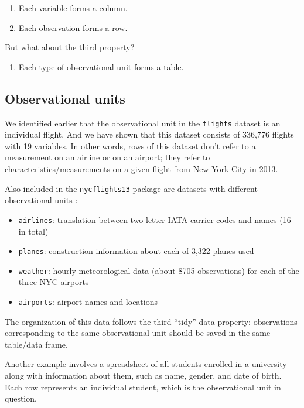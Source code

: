 \documentclass[12pt,]{krantz}
\providecommand{\tightlist}{%
  \setlength{\itemsep}{0pt}\setlength{\parskip}{0pt}}
\renewenvironment{quote}{\begin{VF}}{\end{VF}}
\theoremstyle{definition}
\theoremstyle{definition}
\theoremstyle{definition}
\theoremstyle{remark}
\begin{document}
\begin{enumerate}
\def\labelenumi{\arabic{enumi}.}
\tightlist
\item
  Each variable forms a column.
\item
  Each observation forms a row.
\end{enumerate}

But what about the third property?

\begin{quote}
\begin{enumerate}
\def\labelenumi{\arabic{enumi}.}
\setcounter{enumi}{2}
\tightlist
\item
  Each type of observational unit forms a table.
\end{enumerate}
\end{quote}

\subsection{Observational units}\label{observational-units}

We identified earlier that the observational unit in the
\texttt{flights} dataset is an individual flight. And we have shown that
this dataset consists of 336,776 flights with 19 variables. In other
words, rows of this dataset don't refer to a measurement on an airline
or on an airport; they refer to characteristics/measurements on a given
flight from New York City in 2013.

Also included in the \texttt{nycflights13} package are datasets with
different observational units \citep{R-nycflights13}:

\begin{itemize}
\tightlist
\item
  \texttt{airlines}: translation between two letter IATA carrier codes
  and names (16 in total)
\item
  \texttt{planes}: construction information about each of 3,322 planes
  used
\item
  \texttt{weather}: hourly meteorological data (about 8705 observations)
  for each of the three NYC airports
\item
  \texttt{airports}: airport names and locations
\end{itemize}

The organization of this data follows the third ``tidy'' data property:
observations corresponding to the same observational unit should be
saved in the same table/data frame.

Another example involves a spreadsheet of all students enrolled in a
university along with information about them, such as name, gender, and
date of birth. Each row represents an individual student, which is the
observational unit in question.
\end{document}

